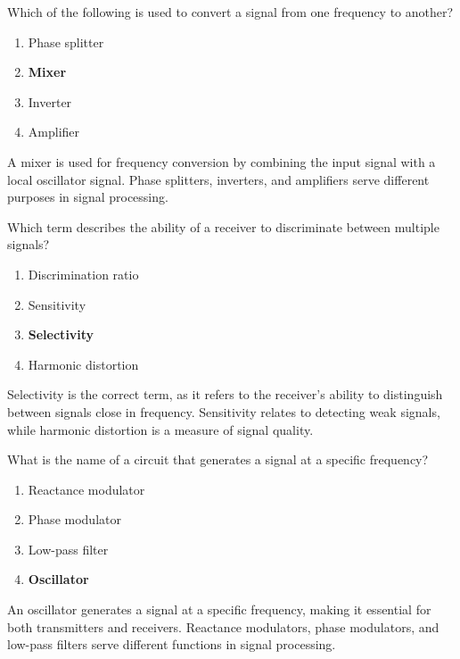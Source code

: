 
\begin{tcolorbox}[colback=gray!10!white,colframe=black!75!black,title={T7A03}]
    Which of the following is used to convert a signal from one frequency to another?
    \begin{enumerate}[label=\Alph*,noitemsep]
        \item Phase splitter
        \item \textbf{Mixer}
        \item Inverter
        \item Amplifier
    \end{enumerate}
\end{tcolorbox}
A mixer is used for frequency conversion by combining the input signal with a local oscillator signal. Phase splitters, inverters, and amplifiers serve different purposes in signal processing.


\begin{tcolorbox}[colback=gray!10!white,colframe=black!75!black,title={T7A04}]
    Which term describes the ability of a receiver to discriminate between multiple signals?
    \begin{enumerate}[label=\Alph*,noitemsep]
        \item Discrimination ratio
        \item Sensitivity
        \item \textbf{Selectivity}
        \item Harmonic distortion
    \end{enumerate}
\end{tcolorbox}
Selectivity is the correct term, as it refers to the receiver's ability to distinguish between signals close in frequency. Sensitivity relates to detecting weak signals, while harmonic distortion is a measure of signal quality.


\begin{tcolorbox}[colback=gray!10!white,colframe=black!75!black,title={T7A05}]
    What is the name of a circuit that generates a signal at a specific frequency?
    \begin{enumerate}[label=\Alph*,noitemsep]
        \item Reactance modulator
        \item Phase modulator
        \item Low-pass filter
        \item \textbf{Oscillator}
    \end{enumerate}
\end{tcolorbox}
An oscillator generates a signal at a specific frequency, making it essential for both transmitters and receivers. Reactance modulators, phase modulators, and low-pass filters serve different functions in signal processing.

